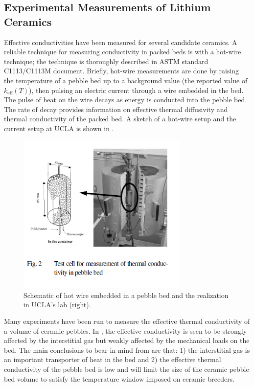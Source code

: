 \documentclass[11pt]{report} %
\begin{document}
\subsection{Experimental Measurements of Lithium Ceramics}
Effective conductivities have been measured for several candidate ceramics. A reliable technique for measuring conductivity in packed beds is with a hot-wire technique; the technique is thoroughly described in ASTM standard C1113/C1113M document. Briefly, hot-wire measurements are done by raising the temperature of a pebble bed up to a background value (the reported value of $k_\text{eff}(T)$), then pulsing an electric current through a wire embedded in the bed. The pulse of heat on the wire decays as energy is conducted into the pebble bed. The rate of decay provides information on effective thermal diffusivity and thermal conductivity of the packed bed. A sketch of a hot-wire setup and the current setup at UCLA is shown in .

\begin{figure}[h]
	\centering
	\includegraphics[trim={0cm 2cm 0cm 0cm},clip, width=0.75\textwidth]{images/HWT} 
	\caption{Schematic of hot wire embedded in a pebble bed and the realization in UCLA's lab (right).}
	\label{fig:HWT}
\end{figure}

Many experiments have been run to measure the effective thermal conductivity of a volume of ceramic pebbles. In , the effective conductivity is seen to be strongly affected by the interstitial gas but weakly affected by the mechanical loads on the bed. The main conclusions to bear in mind from  are that: 1) the interstitial gas is an important transporter of heat in the bed and 2) the effective thermal conductivity of the pebble bed is low and will limit the size of the ceramic pebble bed volume to satisfy the temperature window imposed on ceramic breeders.
\end{document}
